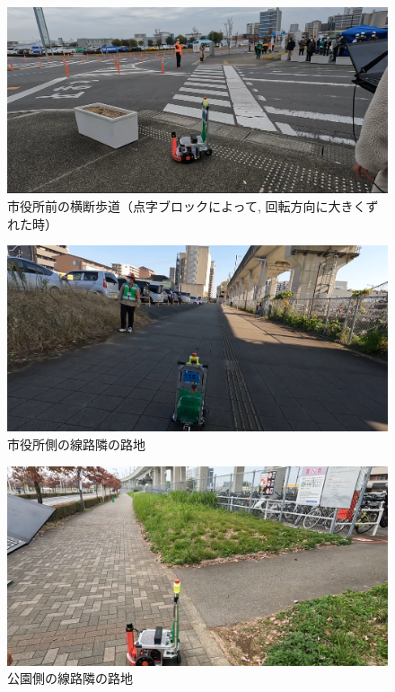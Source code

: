 \documentclass[twocolumn,9pt]{jsproceedings}
\begin{document}
\begin{figure}[h]
  \begin{center}
    \includegraphics[width=1.0\linewidth]{figs/crosswalk_city_hall.pdf}
    \caption{市役所前の横断歩道（点字ブロックによって, 回転方向に大きくずれた時）}
    \label{fig:crosswalk_city_hall}
  \end{center}
\end{figure}

\begin{figure}[h]
  \begin{center}
    \includegraphics[width=1.0\linewidth]{figs/city_hall_side_alley.pdf}
    \caption{市役所側の線路隣の路地}
    \label{fig:city_hall_side_alley}
  \end{center}
\end{figure}

\begin{figure}[h]
  \begin{center}
    \includegraphics[width=1.0\linewidth]{figs/park_side_alley.pdf}
    \caption{公園側の線路隣の路地}
    \label{fig:park_side_alley}
  \end{center}
\end{figure}
\end{document}
